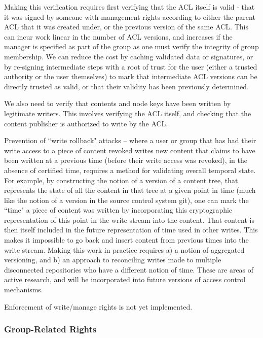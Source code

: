 Making this verification requires first verifying that the ACL itself
is valid - that it was signed by someone with management rights
according to either the parent ACL that it was created under, or the
previous version of the same ACL. This can incur work linear in the
number of ACL versions, and increases if the manager is specified as
part of the group as one must verify the integrity of group
membership. We can reduce the cost by caching validated data or
signatures, or by re-signing intermediate steps with a root of trust
for the user (either a trusted authority or the user themselves) to
mark that intermediate ACL versions can be directly trusted as valid,
or that their validity has been previously determined.

We also need to verify that contents and node keys have been written
by legitimate writers. This involves verifying the ACL itself, and
checking that the content publisher is authorized to write by the ACL.

Prevention of ``write rollback" attacks -- where a user or group that
has had their write access to a piece of content revoked writes new
content that claims to have been written at a previous time (before
their write access was revoked), in the absence of certified time,
requires a method for validating overall temporal state. For example,
by constructing the notion of a version of a content tree, that
represents the state of all the content in that tree at a given point
in time (much like the notion of a version in the source control
system git), one can mark the ``time" a piece of content was written
by incorporating this cryptographic representation of this point in
the write stream into the content. That content is then itself
included in the future representation of time used in other
writes. This makes it impossible to go back and insert content from
previous times into the write stream. Making this work in practice
requires a) a notion of aggregated versioning, and b) an approach to
reconciling writes made to multiple disconnected repositories who have
a different notion of time. These are areas of active research, and
will be incorporated into future versions of access control
mechanisms.

Enforcement of write/manage rights is not yet implemented. 

\subsubsection{Group-Related Rights}

